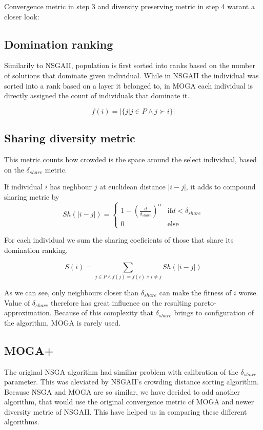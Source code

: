 \documentclass[12pt,oneside]{fithesis2}
\begin{document}
Convergence metric in step 3 and diversity preserving metric in step 4 warant a closer look:

\subsection{Domination ranking}
Similarily to NSGAII, population is first sorted into ranks based on the number of solutions that dominate given individual. While in NSGAII the individual was sorted into a rank based on a layer it belonged to, in MOGA each individual is directly assigned the count of individuals that dominate it.

$$f(i) = |\{j|j \in P \land j \succ i\}|$$

\subsection{Sharing diversity metric}
This metric counts how crowded is the space around the select individual, based on the $\delta_{share}$ metric.

If individual $i$ has neghbour $j$ at euclidean distance $|i-j|$, it adds to compound sharing metric by
$$Sh(|i-j|) = \begin{cases} 
    1 - (\frac{d}{\delta_{share}})^\alpha & \text{if}  d < \delta_{share}\\
    0 & \text{else}
\end{cases}$$

For each individual we sum the sharing coeficients of those that share its domination ranking.

$$ S(i) = \sum\limits_{j \in P \land f(j) =f(i) \land i \neq j} Sh(|i-j|) $$

As we can see, only neighbours closer than $\delta_{share}$ can make the fitness of $i$ worse. Value of $\delta_{share}$ therefore has great influence on the resulting pareto-approximation. Because of this complexity that $\delta_{share}$ brings to configuration of the algorithm, MOGA is rarely used.

\subsection{MOGA+}

The original NSGA algorithm had similiar problem with calibration of the $\delta_{share}$ parameter. This was aleviated by NSGAII's crowding distance sorting algorithm. Because NSGA and MOGA are so similar, we have decided to add another algorithm, that would use the original convergence metric of MOGA and newer diversity metric of NSGAII. This have helped us in comparing these different algorithms.
\end{document}
